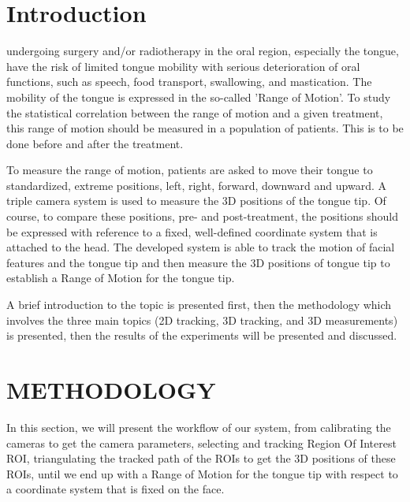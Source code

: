 \documentclass[journal]{IEEEtran}
\begin{document}
\section{Introduction}
% 
% 
% 
% 
 undergoing surgery and/or radiotherapy in the oral region, especially the tongue, have the risk of limited tongue mobility with serious deterioration of oral functions, such as speech, food transport, swallowing, and mastication. The mobility of the tongue is expressed in the so-called 'Range of Motion'. To study the statistical correlation between the range of motion and a given treatment, this range of motion should be measured in a population of patients. This is to be done before and after the treatment.

To measure the range of motion, patients are asked to move their tongue to standardized, extreme positions, left, right, forward, downward and upward. A triple camera system is used to measure the 3D positions of the tongue tip. Of course, to compare these positions, pre- and post-treatment, the positions should be expressed with reference to a fixed, well-defined coordinate system that is attached to the head. The developed system is able to track the motion of facial features and the tongue tip and then measure the 3D positions of tongue tip to establish a Range of Motion for the tongue tip.

A brief introduction to the topic is presented first, then the methodology which involves the three main topics (2D tracking, 3D tracking, and 3D measurements) is presented, then the results of the experiments will be presented and discussed.


\section{METHODOLOGY}
In this section, we will present the workflow of our system, from calibrating the cameras to get the camera parameters, selecting and tracking Region Of Interest ROI, triangulating the tracked path of the ROIs to get the 3D positions of these ROIs, until we end up with a Range of Motion for the tongue tip with respect to a coordinate system that is fixed on the face.
\end{document}
